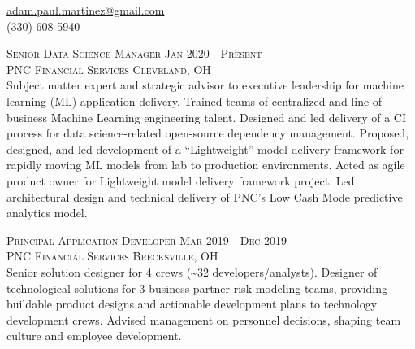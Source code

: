 \documentclass[letterpaper, 11pt]{article} %
\begin{document}
\pagestyle{empty} %



\vspace{-0.5em}

\begin{center}
\href{mailto:adam.paul.martinez@gmail.com}{adam.paul.martinez@gmail.com} \\
(330) 608-5940
\end{center}

\vspace{0.5em}

\justify

\textsc{Senior Data Science Manager \hfill Jan 2020 - Present} \\
\textsc{PNC Financial Services \hfill Cleveland, OH} \\
Subject matter expert and strategic advisor to executive leadership for machine learning (ML) application delivery.
Trained teams of centralized and line-of-business Machine Learning engineering talent.
Designed and led delivery of a CI process for data science-related open-source dependency management.
Proposed, designed, and led development of a ``Lightweight'' model delivery framework for rapidly moving ML models from lab to production environments.
Acted as agile product owner for Lightweight model delivery framework project.
Led architectural design and technical delivery of PNC's Low Cash Mode predictive analytics model.

\textsc{Principal Application Developer \hfill Mar 2019 - Dec 2019} \\
\textsc{PNC Financial Services \hfill Brecksville, OH} \\
Senior solution designer for 4 crews (\textasciitilde 32 developers/analysts).
Designer of technological solutions for 3 business partner risk modeling teams, providing buildable product designs and actionable development plans to technology development crews.
Advised management on personnel decisions, shaping team culture and employee development.
\end{document}

